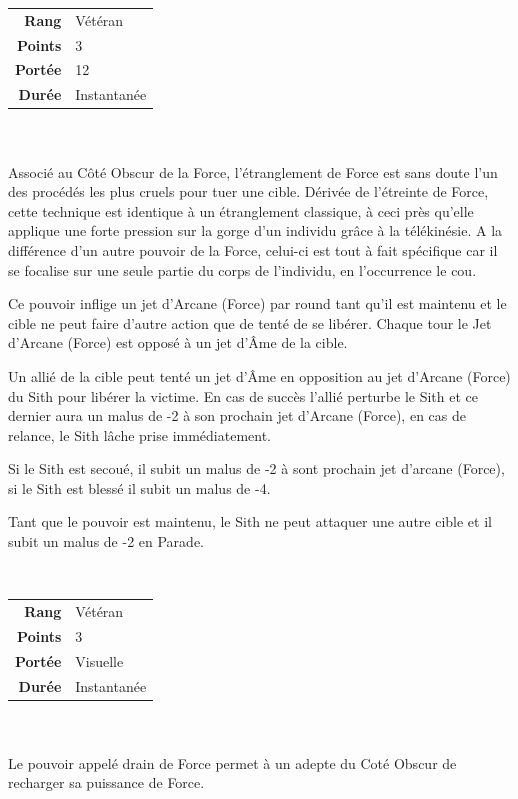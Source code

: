 \begin{description}[align=left]
        \begin{tabular}{ r l }
            \textbf{Rang}    & Vétéran \\
            \textbf{Points}  & 3 \\
            \textbf{Portée}  & 12 \\
            \textbf{Durée}   & Instantanée \\
        \end{tabular}
        \\ \\
        Associé au Côté Obscur de la Force, l’étranglement de Force est sans doute l’un des procédés les plus cruels pour tuer une cible. Dérivée de l’étreinte de Force, cette technique est identique à un étranglement classique, à ceci près qu’elle applique une forte pression sur la gorge d’un individu grâce à la télékinésie. A la différence d’un autre pouvoir de la Force, celui-ci est tout à fait spécifique car il se focalise sur une seule partie du corps de l’individu, en l’occurrence le cou. 

        Ce pouvoir inflige un jet d’Arcane (Force) par round tant qu’il est maintenu et le cible ne peut faire d’autre action que de tenté de se libérer. Chaque tour le Jet d’Arcane (Force) est opposé à un jet d’\^Ame de la cible.

        Un allié de la cible peut tenté un jet d’\^Ame en opposition au jet d’Arcane (Force) du Sith pour libérer la victime. En cas de succès l’allié perturbe le Sith et ce dernier aura un malus de -2 à son prochain jet d’Arcane (Force), en cas de relance, le Sith lâche prise immédiatement.

        Si le Sith est secoué, il subit un malus de -2 à sont prochain jet d’arcane (Force), si le Sith est blessé il subit un malus de -4.

        Tant que le pouvoir est maintenu, le Sith ne peut attaquer une autre cible et il subit un malus de -2 en Parade.
        \\

    \item [Drain de Force] ~ \\

        \begin{tabular}{ r l }
            \textbf{Rang}    & Vétéran \\
            \textbf{Points}  & 3 \\
            \textbf{Portée}  & Visuelle \\
            \textbf{Durée}   & Instantanée \\
        \end{tabular}
        \\ \\
        Le pouvoir appelé drain de Force permet à un adepte du Coté Obscur de recharger sa puissance de Force.


\end{description}
